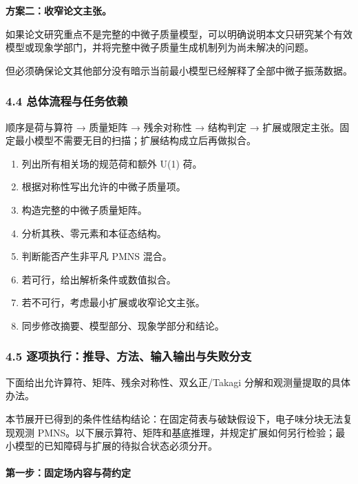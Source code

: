 \documentclass[
  chinese,
  UTF8]{ctexart}
\providecommand{\tightlist}{%
  \setlength{\itemsep}{0pt}\setlength{\parskip}{0pt}}
\begin{document}
\textbf{方案二：收窄论文主张。}

如果论文研究重点不是完整的中微子质量模型，可以明确说明本文只研究某个有效模型或现象学部门，并将完整中微子质量生成机制列为尚未解决的问题。

但必须确保论文其他部分没有暗示当前最小模型已经解释了全部中微子振荡数据。

\subsubsection{4.4 总体流程与任务依赖}\label{major-3-step-4}

顺序是荷与算符 → 质量矩阵 → 残余对称性 → 结构判定 →
扩展或限定主张。固定最小模型不需要无目的扫描；扩展结构成立后再做拟合。

\begin{enumerate}
\def\labelenumi{\arabic{enumi}.}
\tightlist
\item
  列出所有相关场的规范荷和额外 U(1) 荷。
\item
  根据对称性写出允许的中微子质量项。
\item
  构造完整的中微子质量矩阵。
\item
  分析其秩、零元素和本征态结构。
\item
  判断能否产生非平凡 PMNS 混合。
\item
  若可行，给出解析条件或数值拟合。
\item
  若不可行，考虑最小扩展或收窄论文主张。
\item
  同步修改摘要、模型部分、现象学部分和结论。
\end{enumerate}

\subsubsection{4.5
逐项执行：推导、方法、输入输出与失败分支}\label{major-3-step-5}

下面给出允许算符、矩阵、残余对称性、双幺正/Takagi
分解和观测量提取的具体办法。

本节展开已得到的条件性结构结论：在固定荷表与破缺假设下，电子味分块无法复现观测
PMNS。以下展示算符、矩阵和基底推理，并规定扩展如何另行检验；最小模型的已知障碍与扩展的待拟合状态必须分开。

\paragraph{第一步：固定场内容与荷约定}\label{ux7b2cux4e00ux6b65ux56faux5b9aux573aux5185ux5bb9ux4e0eux8377ux7ea6ux5b9a}
\end{document}
